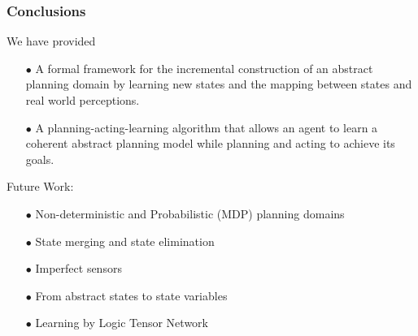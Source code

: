 \documentclass{beamer}
\begin{document}
\begin{frame}
\frametitle{Conclusions}

We have provided
\begin{itemize}
\item[$\bullet$]
A formal framework for the incremental 
construction of an abstract planning domain by learning new states
and the mapping between states and real world perceptions.
\item[$\bullet$]
A planning-acting-learning algorithm that allows an agent to learn
a coherent abstract planning model while planning and acting to achieve its
goals.
\end{itemize}

\pause
{\color {red}
Future Work:}
\begin{itemize}
\item[$\bullet$]
{\color {red}
Non-deterministic and Probabilistic (MDP) planning domains}
\item[$\bullet$]
{\color {red}
State merging and state elimination}
\item[$\bullet$] 
{\color {red} Imperfect sensors}
\item[$\bullet$] 
{\color {red} From abstract states to state variables}
\item[$\bullet$] 
{\color {red} Learning by Logic Tensor Network}
\end{itemize}

\end{frame}
\end{document}
